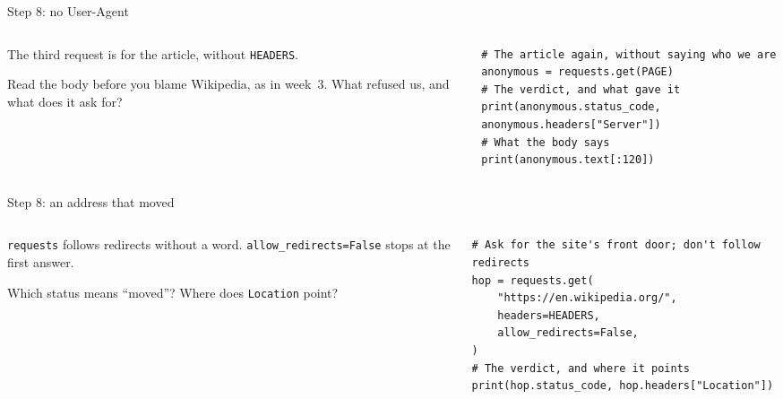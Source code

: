 \documentclass[9pt,aspectratio=169]{beamer}
\begin{document}
\begin{frame}[fragile]{Step 8: no User-Agent}
    \begin{columns}[T]
        \begin{column}{0.37\textwidth}
            The third request is for the article, without \texttt{HEADERS}.

            \medskip
            Read the body before you blame Wikipedia, as in week~3. What refused us, and what does it ask for?
        \end{column}
        \begin{column}{0.6\textwidth}
\begin{lstlisting}[style=lab]
# The article again, without saying who we are
anonymous = requests.get(PAGE)
# The verdict, and what gave it
print(anonymous.status_code, anonymous.headers["Server"])
# What the body says
print(anonymous.text[:120])
\end{lstlisting}
        \end{column}
    \end{columns}
\end{frame}

\begin{frame}[fragile]{Step 8: an address that moved}
    \begin{columns}[T]
        \begin{column}{0.37\textwidth}
            \texttt{requests} follows redirects without a word. \texttt{allow\_redirects=False} stops at the first answer.

            \medskip
            Which status means ``moved''? Where does \texttt{Location} point?
        \end{column}
        \begin{column}{0.6\textwidth}
\begin{lstlisting}[style=lab]
# Ask for the site's front door; don't follow redirects
hop = requests.get(
    "https://en.wikipedia.org/",
    headers=HEADERS,
    allow_redirects=False,
)
# The verdict, and where it points
print(hop.status_code, hop.headers["Location"])
\end{lstlisting}
        \end{column}
    \end{columns}
\end{frame}
\end{document}
